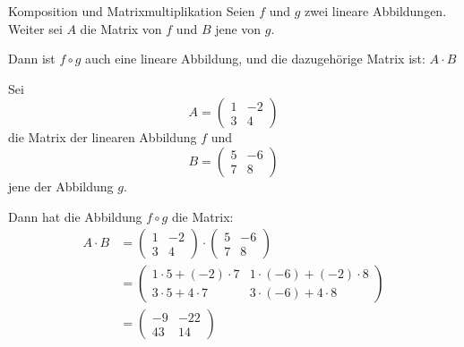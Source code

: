 \begin{satz}
    {Komposition und Matrixmultiplikation}{}
    Seien \( f \) und \( g \) zwei lineare Abbildungen. Weiter sei \( A \) die Matrix von \( f \) und \( B \) jene von \( g \).  

    Dann ist \( f \circ g \) auch eine lineare Abbildung, und die dazugehörige Matrix ist:
    $
    A \cdot B
    $

\end{satz}
\begin{bsp}
    {}{}
    Sei 
    \[
    A = \begin{pmatrix} 1 & -2 \\ 3 & 4 \end{pmatrix}
    \]
    die Matrix der linearen Abbildung \( f \) und 
    \[
    B = \begin{pmatrix} 5 & -6 \\ 7 & 8 \end{pmatrix}
    \]
    jene der Abbildung \( g \).  

    Dann hat die Abbildung \( f \circ g \) die Matrix:
    \begin{align*}
    A \cdot B &=
    \begin{pmatrix} 1 & -2 \\ 3 & 4 \end{pmatrix}
    \cdot
    \begin{pmatrix} 5 & -6 \\ 7 & 8 \end{pmatrix}
    \\
    &=
    \begin{pmatrix} 
    1 \cdot 5 + (-2) \cdot 7 & 1 \cdot (-6) + (-2) \cdot 8 \\ 
    3 \cdot 5 + 4 \cdot 7 & 3 \cdot (-6) + 4 \cdot 8 
    \end{pmatrix}\\
    &=
    \begin{pmatrix} 
    -9 & -22 \\ 43 & 14 
    \end{pmatrix}
\end{align*}

\end{bsp}

